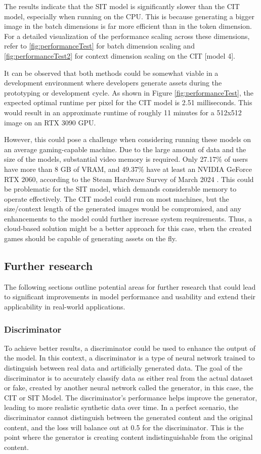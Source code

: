     The results indicate that the SIT model is significantly slower than the CIT model, especially when running on the CPU. This is because generating a bigger image in the batch dimensions is far more efficient than in the token dimension. For a detailed visualization of the performance scaling across these dimensions, refer to \autoref{fig:performanceTest} for batch dimension scaling and \autoref{fig:performanceTest2} for context dimension scaling on the CIT [model 4].

    It can be observed that both methods could be somewhat viable in a development environment where developers generate assets during the prototyping or development cycle. As shown in Figure \autoref{fig:performanceTest}, the expected optimal runtime per pixel for the CIT model is 2.51 milliseconds. This would result in an approximate runtime of roughly 11 minutes for a 512x512 image on an RTX 3090 GPU.
    
    However, this could pose a challenge when considering running these models on an average gaming-capable machine. Due to the large amount of data and the size of the models, substantial video memory is required. Only 27.17\% of users have more than 8 GB of VRAM, and 49.37\% have at least an NVIDIA GeForce RTX 2060, according to the Steam Hardware Survey of March 2024 \autocite{Valve2024}. This could be problematic for the SIT model, which demands considerable memory to operate effectively. The CIT model could run on most machines, but the size/context length of the generated images would be compromised, and any enhancements to the model could further increase system requirements. Thus, a cloud-based solution might be a better approach for this case, when the created games should be capable of generating assets on the fly.
    

\subsection{Further research}

    The following sections outline potential areas for further research that could lead to significant improvements in model performance and usability and extend their applicability in real-world applications.

    \subsubsection{Discriminator}
    To achieve better results, a discriminator could be used to enhance the output of the model. In this context, a discriminator is a type of neural network trained to distinguish between real data and artificially generated data. The goal of the discriminator is to accurately classify data as either real from the actual dataset or fake, created by another neural network called the generator, in this case, the CIT or SIT Model. The discriminator's performance helps improve the generator, leading to more realistic synthetic data over time. In a perfect scenario, the discriminator cannot distinguish between the generated content and the original content, and the loss will balance out at 0.5 for the discriminator. This is the point where the generator is creating content indistinguishable from the original content.

